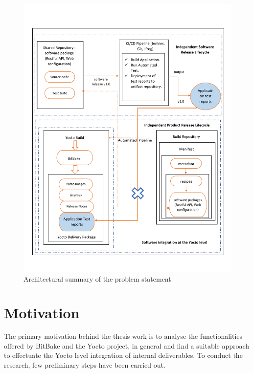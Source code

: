 \begin{figure}
\centering
\includegraphics[scale=0.7]{figures/ThesisYocto.pdf}
\caption[Architectural summary of the problem statement]{Architectural summary of the problem statement}
\label{fig:Architectural summary of the Problem Statement}
\end{figure}


\newpage
\section{Motivation}

The primary motivation behind the thesis work is to analyse the functionalities offered by BitBake and the Yocto project, in general and find a suitable approach to effectuate the Yocto level integration of internal deliverables. To conduct the research, few preliminary steps have been carried out.

